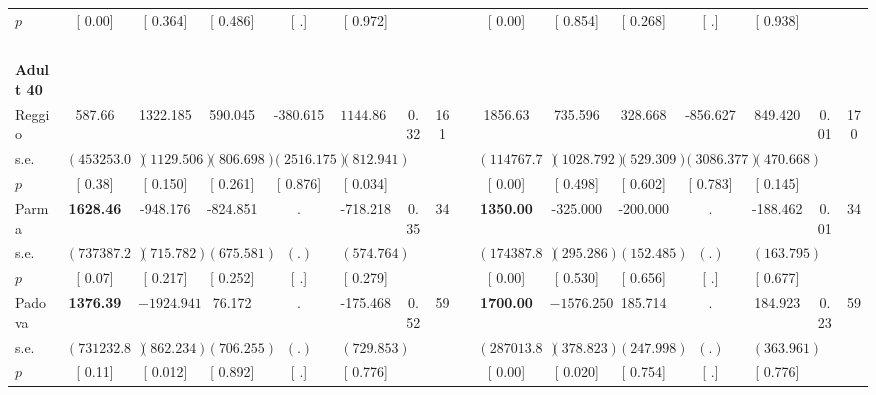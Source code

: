 \begin{longtable}{L{8em} c c c c c c c p{1em} c c c c c c c}
\quad \quad \quad \quad $ p$ & [     0.00] & [    0.364] & [    0.486] & [        .] & [    0.972] & & & & [     0.00] & [    0.854] & [    0.268] & [        .] & [    0.938] & &  \\[1em]
~\\[1em]
\quad \quad \textbf{Adult 40} & & & & & & & & & & & & & & & \\* 
\quad \quad \quad Reggio& 587.66 &  1322.185 &   590.045 &  -380.615 & $ \mathbf{ 1144.866}$ &      0.32 &       161 & & 1856.63 &   735.596 &   328.668 &  -856.627 &   849.420 &      0.01 &       170  \\*
\quad \quad \quad \quad s.e.& $ (453253.00)$ & $ ( 1129.506)$ & $ (  806.698)$ & $ ( 2516.175)$ & $ (  812.941)$ & & & & $ (114767.72)$ & $ ( 1028.792)$ & $ (  529.309)$ & $ ( 3086.377)$ & $ (  470.668)$ & &  \\*
\quad \quad \quad \quad $ p$ & [     0.38] & [    0.150] & [    0.261] & [    0.876] & [    0.034] & & & & [     0.00] & [    0.498] & [    0.602] & [    0.783] & [    0.145] & &  \\[1em]
\quad \quad \quad Parma& \textbf{  1628.46} &  -948.176 &  -824.851 &         . &  -718.218 &      0.35 &        34 & & \textbf{  1350.00} &  -325.000 &  -200.000 &         . &  -188.462 &      0.01 &        34  \\*
\quad \quad \quad \quad s.e.& $ (737387.25)$ & $ (  715.782)$ & $ (  675.581)$ & $ (        .)$ & $ (  574.764)$ & & & & $ (174387.82)$ & $ (  295.286)$ & $ (  152.485)$ & $ (        .)$ & $ (  163.795)$ & &  \\*
\quad \quad \quad \quad $ p$ & [     0.07] & [    0.217] & [    0.252] & [        .] & [    0.279] & & & & [     0.00] & [    0.530] & [    0.656] & [        .] & [    0.677] & &  \\[1em]
\quad \quad \quad Padova& \textbf{  1376.39} & $ \mathbf{-1924.941}$ &    76.172 &         . &  -175.468 &      0.52 &        59 & & \textbf{  1700.00} & $ \mathbf{-1576.250}$ &   185.714 &         . &   184.923 &      0.23 &        59  \\*
\quad \quad \quad \quad s.e.& $ (731232.82)$ & $ (  862.234)$ & $ (  706.255)$ & $ (        .)$ & $ (  729.853)$ & & & & $ (287013.83)$ & $ (  378.823)$ & $ (  247.998)$ & $ (        .)$ & $ (  363.961)$ & &  \\*
\quad \quad \quad \quad $ p$ & [     0.11] & [    0.012] & [    0.892] & [        .] & [    0.776] & & & & [     0.00] & [    0.020] & [    0.754] & [        .] & [    0.776] & &  \\[1em]

\end{longtable}
